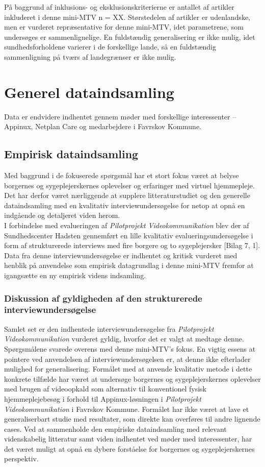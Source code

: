 På baggrund af inklusions- og eksklusionskriterierne er antallet af artikler inkluderet i denne mini-MTV n = XX. Størstedelen af artikler er udenlandske, men er vurderet repræsentative for denne mini-MTV, idet parametrene, som undersøges er sammenlignelige. En fuldstændig generalisering er ikke mulig, idet sundhedsforholdene varierer i de forskellige lande, så en fuldstændig sammenligning på tværs af landegrænser er ikke mulig. 

\section{Generel dataindsamling}
Data er endvidere indhentet gennem møder med forskellige interessenter – Appinux, Netplan Care og medarbejdere i Favrskov Kommune. 

\subsection{Empirisk dataindsamling}
Med baggrund i de fokuserede spørgsmål har et stort fokus været at belyse borgernes og sygeplejerskernes oplevelser og erfaringer med virtuel hjemmepleje. Det har derfor været nærliggende at supplere litteraturstudiet og den generelle dataindsamling med en kvalitativ interviewundersøgelse for netop at opnå en indgående og detaljeret viden herom.\\
I forbindelse med evalueringen af \textit{Pilotprojekt Videokommunikation} blev der af Sundhedscenter Hadsten gennemført en lille kvalitativ evalueringsundersøgelse i form af strukturerede interviews med fire borgere og to sygeplejersker [Bilag 7, 1]. Data fra denne interviewundersøgelse er indhentet og kritisk vurderet med henblik på anvendelse som empirisk datagrundlag i denne mini-MTV fremfor at igangsætte en ny empirisk videns indsamling.

\subsubsection{Diskussion af gyldigheden af den strukturerede interviewundersøgelse}
Samlet set er den indhentede interviewundersøgelse fra \textit{Pilotprojekt Videokommunikation} vurderet gyldig, hvorfor det er valgt at medtage denne. Spørgsmålene svarede overens med denne mini-MTV's fokus. En vigtig essens at pointere ved anvendelsen af interviewundersøgelsen er, at denne ikke efterlader mulighed for generalisering. Formålet med at anvende kvalitativ metode i dette konkrete tilfælde har været at undersøge borgernes og sygeplejerskernes oplevelser med brugen af videoopkald som alternativ til konventionel fysisk hjemmeplejebesøg i forhold til Appinux-løsningen i \textit{Pilotprojekt Videokommunikation} i Favrskov Kommune. Formålet har ikke været at lave et generaliserbart studie med resultater, som direkte kan overføres til andre lignende cases. Ved at sammenholde den empiriske dataindsamling med relevant videnskabelig litteratur samt viden indhentet ved møder med interessenter, har det været muligt at opnå en dybere forståelse for borgernes og sygeplejerskernes perspektiv. 


